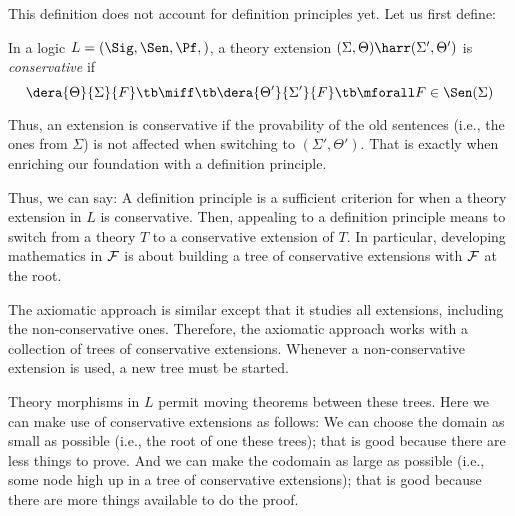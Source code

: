 This definition does not account for definition principles yet. Let us first define:

\begin{definition}
In a logic $L=(\Sig,\Sen,\Pf,\val)$, a theory extension $(\Sigma,\Theta)\harr(\Sigma',\Theta')$ is \emph{conservative} if
  \[\dera{\Theta}{\Sigma}{F} \tb\miff\tb \dera{\Theta'}{\Sigma'}{F} \tb\mforall F\in\Sen(\Sigma)\]
\end{definition}

Thus, an extension is conservative if the provability of the old sentences (i.e., the ones from $\Sigma$) is not affected when switching to $(\Sigma',\Theta')$. That is exactly when enriching our foundation with a definition principle.

Thus, we can say: A definition principle is a sufficient criterion for when a theory extension in $L$ is conservative. Then, appealing to a definition principle means to switch from a theory $T$ to a conservative extension of $T$. In particular, developing mathematics in $\mathcal{F}$ is about building a tree of conservative extensions with $\mathcal{F}$ at the root.
\medskip

The axiomatic approach is similar except that it studies all extensions, including the non-conservative ones. Therefore, the axiomatic approach works with a collection of trees of conservative extensions. Whenever a non-conservative extension is used, a new tree must be started.

Theory morphisms in $L$ permit moving theorems between these trees. Here we can make use of conservative extensions as follows: We can choose the domain as small as possible (i.e., the root of one these trees); that is good because there are less things to prove. And we can make the codomain as large as possible (i.e., some node high up in a tree of conservative extensions); that is good because there are more things available to do the proof.
